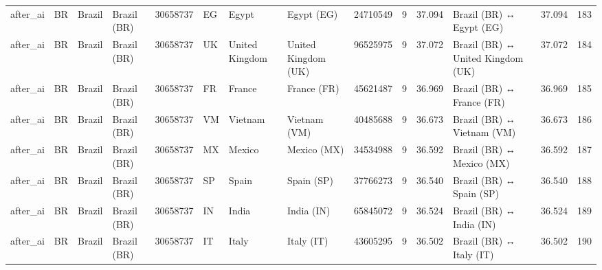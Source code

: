 \begin{tabular}{llllrlllrrrlrr}
after\_ai & BR & Brazil & Brazil (BR) & 30658737 & EG & Egypt & Egypt (EG) & 24710549 & 9 & 37.094 & Brazil (BR) ↔ Egypt (EG) & 37.094 & 183 \\
after\_ai & BR & Brazil & Brazil (BR) & 30658737 & UK & United Kingdom & United Kingdom (UK) & 96525975 & 9 & 37.072 & Brazil (BR) ↔ United Kingdom (UK) & 37.072 & 184 \\
after\_ai & BR & Brazil & Brazil (BR) & 30658737 & FR & France & France (FR) & 45621487 & 9 & 36.969 & Brazil (BR) ↔ France (FR) & 36.969 & 185 \\
after\_ai & BR & Brazil & Brazil (BR) & 30658737 & VM & Vietnam & Vietnam (VM) & 40485688 & 9 & 36.673 & Brazil (BR) ↔ Vietnam (VM) & 36.673 & 186 \\
after\_ai & BR & Brazil & Brazil (BR) & 30658737 & MX & Mexico & Mexico (MX) & 34534988 & 9 & 36.592 & Brazil (BR) ↔ Mexico (MX) & 36.592 & 187 \\
after\_ai & BR & Brazil & Brazil (BR) & 30658737 & SP & Spain & Spain (SP) & 37766273 & 9 & 36.540 & Brazil (BR) ↔ Spain (SP) & 36.540 & 188 \\
after\_ai & BR & Brazil & Brazil (BR) & 30658737 & IN & India & India (IN) & 65845072 & 9 & 36.524 & Brazil (BR) ↔ India (IN) & 36.524 & 189 \\
after\_ai & BR & Brazil & Brazil (BR) & 30658737 & IT & Italy & Italy (IT) & 43605295 & 9 & 36.502 & Brazil (BR) ↔ Italy (IT) & 36.502 & 190 \\
\bottomrule
\end{tabular}
